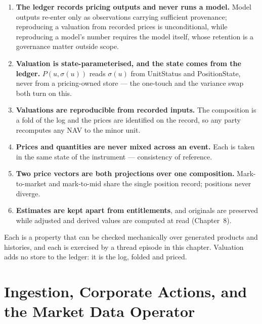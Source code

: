 \documentclass[11pt,a4paper]{article}
\begin{document}
\begin{enumerate}[label=P\arabic*.,leftmargin=*]
\item \textbf{The ledger records pricing outputs and never runs a model.}
  Model outputs re-enter only as observations carrying sufficient provenance;
  reproducing a valuation from recorded prices is unconditional, while
  reproducing a model's number requires the model itself, whose retention is a
  governance matter outside scope.
\item \textbf{Valuation is state-parameterised, and the state comes from the
  ledger.} $P(u,\sigma(u))$ reads $\sigma(u)$ from UnitStatus and
  PositionState, never from a pricing-owned store --- the one-touch and the
  variance swap both turn on this.
\item \textbf{Valuations are reproducible from recorded inputs.} The
  composition is a fold of the log and the prices are identified on the record,
  so any party recomputes any NAV to the minor unit.
\item \textbf{Prices and quantities are never mixed across an event.} Each
  is taken in the same state of the instrument --- consistency of reference.
\item \textbf{Two price vectors are both projections over one composition.}
  Mark-to-market and mark-to-mid share the single position record; positions
  never diverge.
\item \textbf{Estimates are kept apart from entitlements}, and originals are
  preserved while adjusted and derived values are computed at read
  (Chapter~8).
\end{enumerate}

Each is a property that can be checked mechanically over generated products and
histories, and each is exercised by a thread episode in this chapter. Valuation
adds no store to the ledger: it is the log, folded and priced.

\section{Ingestion, Corporate Actions, and the Market Data Operator}\label{ch:marketdata}
\end{document}
